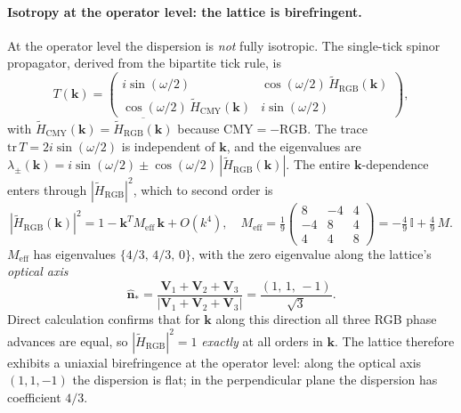 \paragraph{Isotropy at the operator level: the lattice is birefringent.}
At the operator level the dispersion is \emph{not} fully isotropic.
The single-tick spinor propagator, derived from the bipartite tick
rule, is
\begin{equation}
    T(\mathbf{k}) = \begin{pmatrix}
        i\sin(\omega/2) & \cos(\omega/2)\,\tilde{H}_\text{RGB}(\mathbf{k}) \\
        \cos(\omega/2)\,\tilde{H}_\text{CMY}(\mathbf{k}) & i\sin(\omega/2)
    \end{pmatrix},
\end{equation}
with $\tilde{H}_\text{CMY}(\mathbf{k}) = \overline{\tilde{H}_\text{RGB}(\mathbf{k})}$
because $\text{CMY} = -\text{RGB}$.  The trace
$\text{tr}\,T = 2i\sin(\omega/2)$ is independent of $\mathbf{k}$, and
the eigenvalues are
$\lambda_\pm(\mathbf{k}) = i\sin(\omega/2) \pm \cos(\omega/2)\,
|\tilde{H}_\text{RGB}(\mathbf{k})|$.
The entire $\mathbf{k}$-dependence enters through
$|\tilde{H}_\text{RGB}|^2$, which to second order is
\begin{equation}
    |\tilde{H}_\text{RGB}(\mathbf{k})|^2
        = 1 - \mathbf{k}^T M_\text{eff}\,\mathbf{k} + O(k^4),
        \quad
    M_\text{eff} = \tfrac{1}{9}
    \begin{pmatrix} 8 & -4 & 4 \\ -4 & 8 & 4 \\ 4 & 4 & 8 \end{pmatrix}
    = -\tfrac{4}{9}\,\mathbb{I} + \tfrac{4}{9}\,M.
    \label{eq:M_eff}
\end{equation}
$M_\text{eff}$ has eigenvalues $\{4/3,\,4/3,\,0\}$, with the zero
eigenvalue along the lattice's \emph{optical axis}
\begin{equation}
    \hat{\mathbf{n}}_*
        = \frac{\mathbf{V}_1 + \mathbf{V}_2 + \mathbf{V}_3}
               {|\mathbf{V}_1+\mathbf{V}_2+\mathbf{V}_3|}
        = \frac{(1,\, 1,\, -1)}{\sqrt{3}}.
    \label{eq:optical_axis}
\end{equation}
Direct calculation confirms that for $\mathbf{k}$ along this direction
all three RGB phase advances are equal, so
$|\tilde{H}_\text{RGB}|^2 = 1$ \emph{exactly} at all orders in $\mathbf{k}$.
The lattice therefore exhibits a uniaxial birefringence at the operator
level: along the optical axis $(1,1,-1)$ the dispersion is flat;
in the perpendicular plane the dispersion has coefficient $4/3$.

